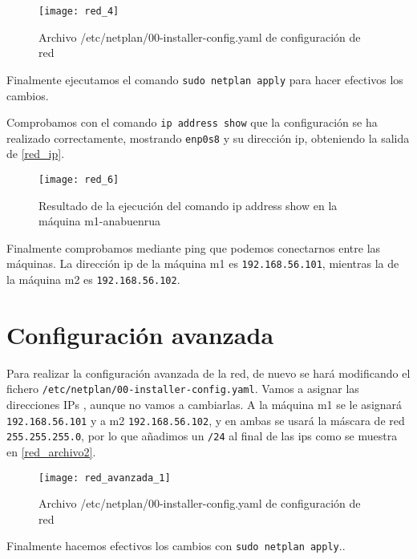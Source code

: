 \begin{figure}
\begin{center}
\caption{Archivo /etc/netplan/00-installer-config.yaml de configuración de red}
\label{red_archivo}
\texttt{[image: red\_4]}
\end{center}
\end{figure}

Finalmente ejecutamos el comando \verb|sudo netplan apply| para hacer efectivos los cambios.

Comprobamos con el comando \verb|ip address show| que la configuración se ha realizado correctamente, mostrando \verb|enp0s8| y su dirección ip, obteniendo la salida de \eqref{red_ip}.

\begin{figure}
\begin{center}
\caption{Resultado de la ejecución del comando ip address show en la máquina m1-anabuenrua}
\label{red_ip}
\texttt{[image: red\_6]}
\end{center}
\end{figure}


Finalmente comprobamos mediante ping que podemos conectarnos entre las máquinas. La dirección ip de la máquina m1 es \verb|192.168.56.101|, mientras la de la máquina m2 es \verb|192.168.56.102|.

\section{Configuración avanzada}

Para realizar la configuración avanzada de la red, de nuevo se hará modificando el fichero \verb|/etc/netplan/00-installer-config.yaml|. Vamos a asignar las direcciones IPs , aunque no vamos a cambiarlas. A la máquina m1 se le asignará \verb|192.168.56.101| y a m2 \verb|192.168.56.102|, y en ambas se usará la máscara de red \verb|255.255.255.0|, por lo que añadimos un \verb|/24| al final de las ips como se muestra en \eqref{red_archivo2}.

\begin{figure}[h!]
\begin{center}
\caption{Archivo /etc/netplan/00-installer-config.yaml de configuración de red}
\label{red_archivo2}
\texttt{[image: red\_avanzada\_1]}
\end{center}
\end{figure}

Finalmente hacemos efectivos los cambios con \verb|sudo netplan apply|..

